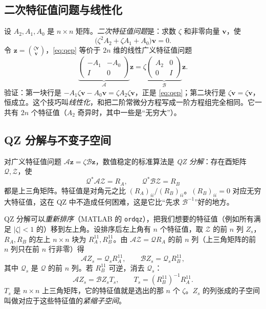 \documentclass[11pt,a4paper,fontset=fandol]{ctexart}
\begin{document}
\subsection{二次特征值问题与线性化}
\label{sec:qep}

设 $A_2,A_1,A_0$ 是 $n\times n$ 矩阵。\emph{二次特征值问题}是：求数 $\zeta$ 和非零向量 $\bm v$，使
\begin{equation}
\label{eq:qep}
\bigl(\zeta^2A_2+\zeta A_1+A_0\bigr)\bm v=0 .
\end{equation}
令 $\bm z=\binom{\zeta\bm v}{\bm v}$，\eqref{eq:qep} 等价于 $2n$ 维的线性广义特征值问题
\begin{equation}
\label{eq:linearize}
\underbrace{\begin{pmatrix}-A_1&-A_0\\ I&0\end{pmatrix}}_{\mathcal A}\bm z=\zeta\underbrace{\begin{pmatrix}A_2&0\\0&I\end{pmatrix}}_{\mathcal B}\bm z .
\end{equation}
验证：第一块行是 $-A_1\zeta\bm v-A_0\bm v=\zeta A_2\zeta\bm v$，正是 \eqref{eq:qep}；第二块行是 $\zeta\bm v=\zeta\bm v$，恒成立。这个技巧叫\emph{线性化}，和把二阶常微分方程写成一阶方程组完全相同。它一共有 $2n$ 个特征值（$A_2$ 奇异时，其中一些是“无穷大”）。

\subsection{QZ 分解与不变子空间}
\label{sec:qz}

对广义特征值问题 $\mathcal A\bm z=\zeta\mathcal B\bm z$，数值稳定的标准算法是 \emph{QZ 分解}：存在酉矩阵 $\mathcal Q,\mathcal Z$，使
\[
\mathcal Q^*\mathcal A\mathcal Z=R_A,\qquad \mathcal Q^*\mathcal B\mathcal Z=R_B
\]
都是上三角矩阵。特征值是对角元之比 $(R_A)_{ii}/(R_B)_{ii}$。$(R_B)_{ii}=0$ 对应无穷大特征值，这在 QZ 中不造成任何困难，这是它比“先求 $\mathcal B^{-1}$”好的地方。

QZ 分解可以\emph{重新排序}（MATLAB 的 \texttt{ordqz}），把我们想要的特征值（例如所有满足 $|\zeta|<1$ 的）移到左上角。设排序后左上角有 $n$ 个特征值，取 $\mathcal Z$ 的前 $n$ 列 $Z_s$，$R_A,R_B$ 的左上 $n\times n$ 块为 $R_A^{11},R_B^{11}$。由 $\mathcal A\mathcal Z=\mathcal QR_A$ 的前 $n$ 列（上三角矩阵的前 $n$ 列只在前 $n$ 行非零）得
\[
\mathcal AZ_s=\mathcal Q_sR_A^{11},\qquad \mathcal BZ_s=\mathcal Q_sR_B^{11},
\]
其中 $\mathcal Q_s$ 是 $\mathcal Q$ 的前 $n$ 列。若 $R_B^{11}$ 可逆，消去 $\mathcal Q_s$：
\begin{equation}
\label{eq:deflating}
\mathcal AZ_s=\mathcal BZ_sT_s,\qquad T_s=(R_B^{11})^{-1}R_A^{11}.
\end{equation}
$T_s$ 是 $n\times n$ 上三角矩阵，它的特征值就是选出的那 $n$ 个 $\zeta$。$Z_s$ 的列张成的子空间叫做对应于这些特征值的\emph{紧缩子空间}。
\end{document}
